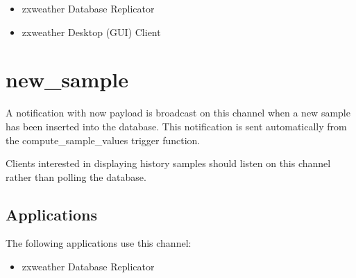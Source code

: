 \documentclass[a4paper,10pt]{book}
\newcommand{\partnumber}{\ifthenelse{\isundefined{\projectnum}}{}{\projectnum-\docnum	\ifthenelse{\equal{\docrev}{001}}{}{.\docrev}}}
\begin{document}
\begin{itemize}
\item zxweather Database Replicator
\item zxweather Desktop (GUI) Client
\end{itemize}

\section{new\_sample}
A notification with now payload is broadcast on this channel when a new sample has been inserted into the database. This notification is sent automatically from the compute\_sample\_values trigger function.

Clients interested in displaying history samples should listen on this channel rather than polling the database.

\subsection{Applications}
The following applications use this channel:

\begin{itemize}
\item zxweather Database Replicator
\end{itemize}


\newpage
\thispagestyle{empty}
\begin{flushright}
\null
\vfill
\tt \partnumber
\end{flushright}
\end{document}
